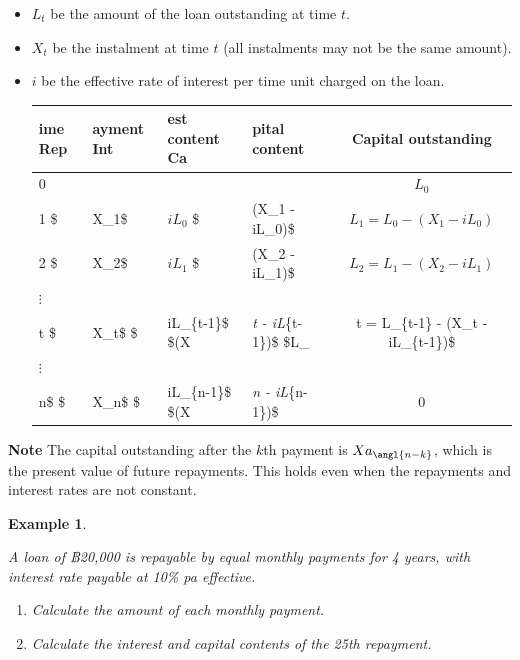 \documentclass[
]{book}
\theoremstyle{definition}
\theoremstyle{definition}
\newtheorem{example}{Example}[chapter]
\theoremstyle{definition}
\theoremstyle{definition}
\theoremstyle{remark}
\begin{document}
\begin{itemize}
\item
  \(L_t\) be the amount of the loan outstanding at time \(t\).
\item
  \(X_t\) be the instalment at time \(t\) (all instalments may not be the
  same amount).
\item
  \(i\) be the effective rate of interest per time unit charged on the
  loan.

  \begin{longtable}[]{@{}llllc@{}}
  \toprule
  ime Rep & ayment Int & est content Ca & pital content & Capital outstanding \\
  \midrule
  \endhead
  0 & & & & \(L_0\) \\
  1 \$ & X\_1\$ & \(iL_0\) \$ & (X\_1 - iL\_0)\$ & \(L_1 = L_0 - (X_1 - iL_0)\) \\
  2 \$ & X\_2\$ & \(iL_1\) \$ & (X\_2 - iL\_1)\$ & \(L_2 = L_1 - (X_2 - iL_1)\) \\
  \(\vdots\) & & & & \\
  t \$ & X\_t\$ \$ & iL\_\{t-1\}\$ \$(X & \emph{t - iL}\{t-1\})\$ \$L\_ & t = L\_\{t-1\} - (X\_t - iL\_\{t-1\})\$ \\
  \(\vdots\) & & & & \\
  n\$ \$ & X\_n\$ \$ & iL\_\{n-1\}\$ \$(X & \emph{n - iL}\{n-1\})\$ & 0 \\
  \bottomrule
  \end{longtable}
\end{itemize}

\textbf{Note} The capital outstanding after the \(k\)th payment is
\(X a_{\angl{n-k}}\), which is the present value of future repayments.
This holds even when the repayments and interest rates are not constant.

\begin{example}
\protect\hypertarget{exm:unlabeled-div-49}{}\label{exm:unlabeled-div-49}

\emph{A loan of ฿20,000 is repayable by equal monthly payments for 4 years,
with interest rate payable at 10\% pa effective.}

\begin{enumerate}
\def\labelenumi{\arabic{enumi}.}
\item
  \emph{Calculate the amount of each monthly payment.}
\item
  \emph{Calculate the interest and capital contents of the 25th repayment.}
\end{enumerate}

\end{example}
\end{document}
